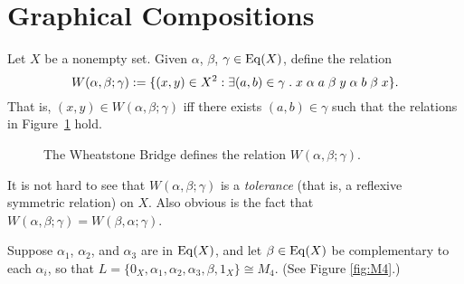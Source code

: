 \section{Graphical Compositions}
Let $X$ be a nonempty set. Given $\alpha$, $\beta$, $\gamma \in \operatorname{Eq}(X)$,
define the relation 
\[
W(\alpha, \beta; \gamma) := \{(x,y) \in X^2 : \exists (a, b) \in \gamma
\; . \; x \mathrel{\alpha} a \mathrel{\beta} y \mathrel{\alpha} b \mathrel{\beta} x\}.
\]
That is, $(x,y) \in W(\alpha, \beta; \gamma)$ iff there exists $(a,b)\in \gamma$
such that the relations in Figure~\ref{fig:wsb} hold.


\begin{figure}[!h]
  \caption{The Wheatstone Bridge defines the relation 
    $W(\alpha, \beta; \gamma)$. }
  \label{fig:wsb}
\end{figure}
It is not hard to see that $W(\alpha, \beta; \gamma)$ is a 
\emph{tolerance} (that is, a reflexive symmetric relation)
on $X$.  Also obvious is the fact that 
$W(\alpha, \beta; \gamma) = W(\beta, \alpha; \gamma)$.

Suppose $\alpha_1$, $\alpha_2$, and $\alpha_3$ are \pppc in $\operatorname{Eq}(X)$, and
let $\beta\in \operatorname{Eq}(X)$ be complementary to 
each 
$\alpha_i$, so that $L = \{0_X, \alpha_1, \alpha_2, \alpha_3, \beta, 1_X\} \cong M_4$. (See Figure \ref{fig:M4}.)


